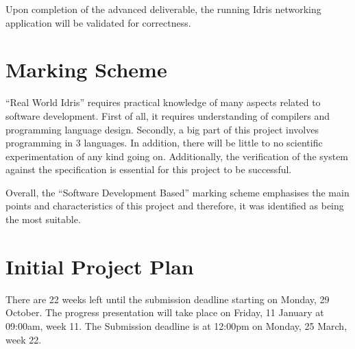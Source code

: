 \documentclass[a4paper]{report}
\begin{document}
Upon completion of the advanced deliverable, the running Idris networking
application will be validated for correctness.



\section{Marking Scheme}
``Real World Idris'' requires practical knowledge of many aspects related to
software development.
First of all, it requires understanding of compilers and programming language
design.
Secondly, a big part of this project involves programming in 3 languages.
In addition, there will be little to no scientific experimentation of any kind
going on.
Additionally, the verification of the system against the specification is
essential for this project to be successful.

Overall, the ``Software Development Based'' marking scheme
emphasises the main points and characteristics of this project and therefore,
it was identified as being the most suitable.




\section{Initial Project Plan}
There are 22 weeks left until the submission deadline starting on Monday,
29 October.
The progress presentation will take place on Friday, 11 January at
09:00am, week 11.
The Submission deadline is at 12:00pm on Monday, 25 March, week 22.
\end{document}
